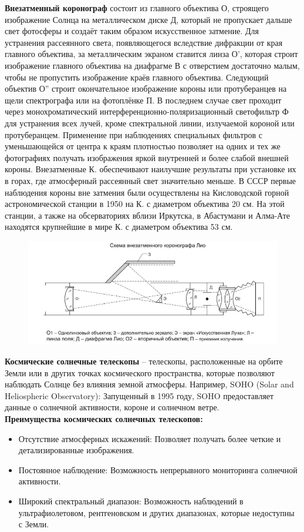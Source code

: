\documentclass[12pt]{article}
\begin{document}
	\textbf{Внезатменный коронограф} состоит из главного объектива О, строящего изображение
	Солнца на металлическом диске Д, который не пропускает дальше свет
	фотосферы и создаёт таким образом искусственное затмение.
	Для устранения рассеянного света, появляющегося вследствие дифракции от края
	главного объектива, за металлическим экраном ставится линза О', которая строит
	изображение главного объектива на диафрагме В с отверстием достаточно малым,
	чтобы не пропустить изображение краёв главного объектива.
	Следующий объектив О'' строит окончательное изображение короны или
	протуберанцев на щели спектрографа или на фотоплёнке П. В последнем случае
	свет проходит через монохроматический
	интерференционно-поляризационный светофильтр Ф для устранения всех лучей,
	кроме спектральной линии, излучаемой короной или протуберанцем.
	Применение при наблюдениях специальных фильтров с уменьшающейся от центра к краям
	плотностью позволяет на одних и тех же фотографиях получать изображения яркой внутренней
	и более слабой внешней короны. Внезатменные К. обеспечивают наилучшие результаты при
	установке их в горах, где атмосферный рассеянный свет значительно меньше.
	В СССР первые наблюдения короны вне затмения были осуществлены на
	Кисловодской горной астрономической станции в 1950 на К. с диаметром объектива
	20 см. На этой станции, а также на обсерваториях вблизи Иркутска, в Абастумани и
	Алма-Ате находятся крупнейшие в мире К. с диаметром объектива 53 см.
	
\begin{figure}[h]
	\centering
	\includegraphics[width=0.6\linewidth]{"Снимок экрана от 2024-12-23 15-24-04"}
\end{figure}
	\textbf{Космические солнечные телескопы} -- телескопы, расположенные на орбите Земли или в других точках космического пространства, которые позволяют наблюдать Солнце без влияния земной атмосферы. Например,
	SOHO (Solar and Heliospheric Observatory): Запущенный в 1995 году, SOHO предоставляет данные о солнечной активности, короне и солнечном ветре.\\
	\textbf{Преимущества космических солнечных телескопов:}
	\begin{itemize}
	\item Отсутствие атмосферных искажений: Позволяет получать более четкие и детализированные изображения.
	\item Постоянное наблюдение: Возможность непрерывного мониторинга солнечной активности.
	\item Широкий спектральный диапазон: Возможность наблюдений в ультрафиолетовом, рентгеновском и других диапазонах, которые недоступны с Земли.
	\end{itemize}
\end{document}

